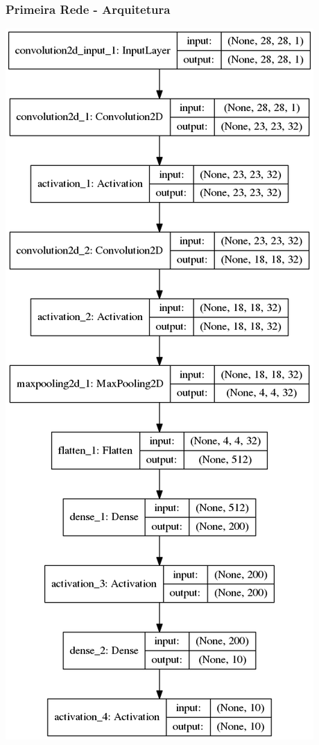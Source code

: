 \documentclass[tikz,11pt]{beamer}
\begin{document}
\begin{frame}
	\frametitle{Primeira Rede - Arquitetura}
	\centering
	\includegraphics[height=.8\paperheight]{images/resultados/default/model}
\end{frame}
\end{document}
